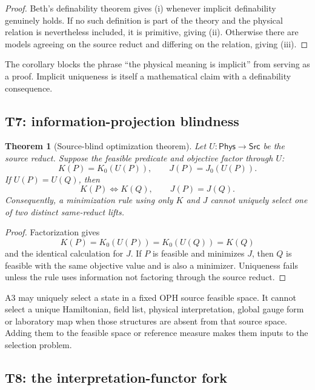 \documentclass[10pt,a4paper]{article}
\newtheorem{theorem}{Theorem}[section]
\theoremstyle{definition}
\theoremstyle{remark}
\newcommand{\Phys}{\mathsf{Phys}}
\newcommand{\Src}{\mathsf{Src}}
\begin{document}
\begin{proof}
Beth's definability theorem gives (i) whenever implicit definability genuinely
holds.  If no such definition is part of the theory and the physical relation
is nevertheless included, it is primitive, giving (ii).  Otherwise there are
models agreeing on the source reduct and differing on the relation, giving
(iii).
\end{proof}

The corollary blocks the phrase ``the physical meaning is implicit'' from
serving as a proof.  Implicit uniqueness is itself a mathematical claim with a
definability consequence.

\subsection{T7: information-projection blindness}

\begin{theorem}[Source-blind optimization theorem]
\label{thm:iprojection}
Let \(U:\Phys\to\Src\) be the source reduct.  Suppose the feasible predicate
and objective factor through \(U\):
\[
K(P)=K_0(U(P)),
\qquad
J(P)=J_0(U(P)).
\]
If \(U(P)=U(Q)\), then
\[
K(P)\Longleftrightarrow K(Q),
\qquad
J(P)=J(Q).
\]
Consequently, a minimization rule using only \(K\) and \(J\) cannot uniquely
select one of two distinct same-reduct lifts.
\end{theorem}

\begin{proof}
Factorization gives
\[
K(P)=K_0(U(P))=K_0(U(Q))=K(Q)
\]
and the identical calculation for \(J\).  If \(P\) is feasible and minimizes
\(J\), then \(Q\) is feasible with the same objective value and is also a
minimizer.  Uniqueness fails unless the rule uses information not factoring
through the source reduct.
\end{proof}

\begin{resultbox}
A3 may uniquely select a state in a fixed OPH source feasible space.  It cannot
select a unique Hamiltonian, field list, physical interpretation, global gauge
form or laboratory map when those structures are absent from that source
space.  Adding them to the feasible space or reference measure makes them
inputs to the selection problem.
\end{resultbox}

\subsection{T8: the interpretation-functor fork}
\end{document}
